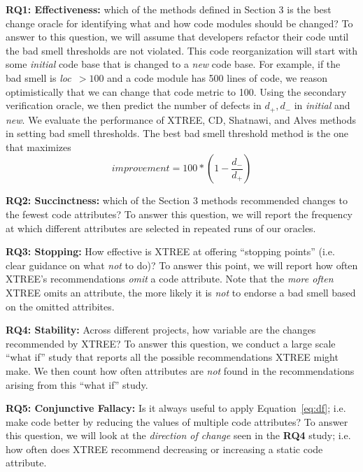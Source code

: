 \documentclass[twocolumn,5p]{elsarticle}
\newcommand{\eq}[1]{Equation~\ref{eq:#1}}
\theoremstyle{break}
\begin{document}
\begin{itemize}
		{\bf RQ1: Effectiveness: } which of the methods defined in Section 3 is the best change oracle for identifying what and how code modules should be changed? 
		To   answer to this question, we will assume that developers
		refactor their code until the bad smell thresholds are not violated.
		This code reorganization will start with some {\em initial} code
		base that is changed to a {\em new} code base. 
		For example, if the bad smell is \mbox{{\em loc $>100$}} and a 
		code module has 500 lines of code, we reason
		optimistically that we can change that code metric
		to 100.  
		Using the secondary verification oracle,  we then predict the
		number of defects in $d_+,d_-$ in {\em initial} and {\em new}. We evaluate the performance of XTREE, CD, Shatnawi, and Alves methods in setting bad smell thresholds.
		The best bad smell threshold method is the one that maximizes
		\begin{equation}\label{eq:diff}
			\mathit{improvement} = 100* \left(1 - \frac{ d_- }{ d_+}\right)
		\end{equation}
		
		
		{\bf RQ2: Succinctness: } which of the Section 3 methods recommended changes to the fewest code attributes?
		To answer this question, we will report the frequency at which different attributes are selected in repeated runs of our oracles.
		
		{\bf RQ3: Stopping: }    How effective is XTREE at offering   ``stopping points'' (i.e. clear guidance on what {\em not} to do)?   
		To answer this point, we will report how often XTREE's recommendations {\em omit} a code attribute. 
		Note that the {\em more often} XTREE omits an attribute, the more likely it is {\em not} to endorse a bad smell based on the omitted
		attribites.
		
		{\bf RQ4: Stability:} Across different projects, how variable are the changes recommended by XTREE?   To answer this
		question, we conduct a large scale ``what if'' study that reports all the possible recommendations XTREE might make.
		We then count how often attributes are {\em not} found in the recommendations arising from this ``what if'' study.
		
		{\bf RQ5: Conjunctive Fallacy:} Is  it  always  useful  to  apply \eq{df}; i.e.   make  code  better  by  reducing  the  values  of multiple code attributes? To answer this question, we will look at the {\em direction of change} seen in the {\bf RQ4} study; i.e.
		how often does XTREE recommend decreasing or increasing a static code attribute.
		

\end{itemize}
\end{document}
